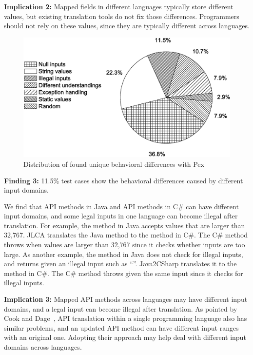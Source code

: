 \textbf{Implication 2:} Mapped  fields in different languages typically store different values, but existing translation tools do not fix those differences. Programmers should not rely on these values, since they are typically different across languages.
\begin{figure}[t]
\centering
\includegraphics[scale=0.32,clip]{figure/pex-percent.eps}\vspace*{-2ex}
 \caption{Distribution of found unique behavioral differences with Pex}\vspace*{-5ex}
 \label{fig:pex-percent}
\end{figure}

\textbf{Finding 3:} 11.5\% test cases show the behavioral differences caused by different input domains.

We find that API methods in Java and API methods in C\# can have different input domains, and some legal inputs in one language can become illegal after translation. For example, the  method in Java accepts values that are larger than 32,767. JLCA translates the Java method to the  method in C\#. The C\# method throws  when values are larger than 32,767 since it checks whether inputs are too large.
As another example, the  method in Java does not check for illegal inputs, and returns  given an illegal input such as ``''. Java2CSharp translates it to the  method in C\#. The C\# method throws  given the same input since it checks for illegal inputs.

\textbf{Implication 3:} Mapped API methods across languages may have different input domains, and a legal input can become illegal after translation. As pointed by Cook and Dage~\cite{cook1999highly}, API translation within a single programming language also has similar problems, and an updated API method can have different input ranges with an original one. Adopting their approach may help deal with different input domains across languages.

